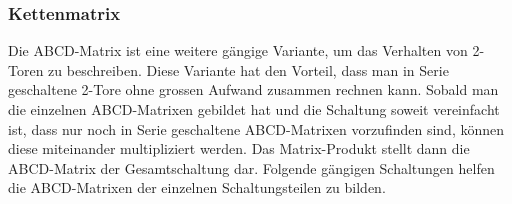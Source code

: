 \subsubsection{Kettenmatrix}\label{subsec:kettenmatrix}

Die ABCD-Matrix ist eine weitere gängige Variante, um das Verhalten von 2-Toren zu beschreiben. Diese Variante hat den Vorteil, dass man in Serie geschaltene 2-Tore ohne grossen Aufwand zusammen rechnen kann. Sobald man die einzelnen ABCD-Matrixen gebildet hat und die Schaltung soweit vereinfacht ist, dass nur noch in Serie geschaltene ABCD-Matrixen vorzufinden sind, können diese miteinander multipliziert werden. Das Matrix-Produkt stellt dann die ABCD-Matrix der Gesamtschaltung dar. Folgende gängigen Schaltungen helfen die ABCD-Matrixen der einzelnen Schaltungsteilen zu bilden.

